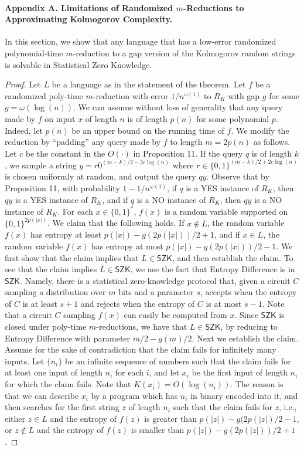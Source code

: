 \paragraph{Appendix A. Limitations of Randomized $m$-Reductions to Approximating Kolmogorov Complexity.}
In this section, we show that any language that has a low-error randomized polynomial-time $m$-reduction to a gap version of the Kolmogorov random strings is solvable in Statistical Zero Knowledge.
\begin{proof}
Let $L$ be a language as in the statement of the theorem. Let $f$ be a randomized poly-time $m$-reduction with error $1/n^{\omega(1)}$ to $R_K$ with gap $g$ for some $g=\omega(\log(n))$.
We can assume without loss of generality that any query made by $f$ on input $x$ of length $n$ is of length $p(n)$ for some polynomial $p$. Indeed, let $p(n)$ be an upper bound on the running time of $f$. We modify the reduction by ``padding'' any query made by $f$ to length $m=2p(n)$ as follows. Let $c$ be the constant in the $O(\cdot)$ in Proposition 11. If the query $q$ is of length $k$, we sample a string $y=r0^{(m-k)/2-2c\log(n)}$ where $r\in\{0,1\}^{(m-k)/2+2c\log(n)}$ is chosen uniformly at random, and output the query $qy$. Observe that by Proposition 11, with probability $1-1/n^{\omega(1)}$, if $q$ is a YES instance of $R_K$, then $qy$ is a YES instance of $R_K$, and if $q$ is a NO instance of $R_K$, then $qy$ is a NO instance of $R_K$.
For each $x\in\{0,1\}^*$, $f(x)$ is a random variable supported on $\{0,1\}^{2p(|x|)}$. We claim that the following holds. If $x\notin L$, the random variable $f(x)$ has entropy at least $p(|x|)-g(2p(|x|))/2+1$, and if $x\in L$, the random variable $f(x)$ has entropy at most $p(|x|)-g(2p(|x|))/2-1$.
We first show that the claim implies that $L\in\mathsf{SZK}$, and then establish the claim. To see that the claim implies $L\in\mathsf{SZK}$, we use the fact that Entropy Difference is in $\mathsf{SZK}$. Namely, there is a statistical zero-knowledge protocol that, given a circuit $C$ sampling a distribution over $m$ bits and a parameter $s$, accepts when the entropy of $C$ is at least $s+1$ and rejects when the entropy of $C$ is at most $s-1$. Note that a circuit $C$ sampling $f(x)$ can easily be computed from $x$. Since $\mathsf{SZK}$ is closed under poly-time $m$-reductions, we have that $L\in\mathsf{SZK}$, by reducing to Entropy Difference with parameter $m/2-g(m)/2$.
Next we establish the claim. Assume for the sake of contradiction that the claim fails for infinitely many inputs. Let $\{n_i\}$ be an infinite sequence of numbers such that the claim fails for at least one input of length $n_i$ for each $i$, and let $x_i$ be the first input of length $n_i$ for which the claim fails. Note that $K(x_i)=O(\log(n_i))$. The reason is that we can describe $x_i$ by a program which has $n_i$ in binary encoded into it, and then searches for the first string $z$ of length $n_i$ such that the claim fails for $z$, i.e., either $z\in L$ and the entropy of $f(z)$ is greater than $p(|z|)-g(2p(|z|)/2-1$, or $z\notin L$ and the entropy of $f(z)$ is smaller than $p(|z|)-g(2p(|z|))/2+1$.

\end{proof}
